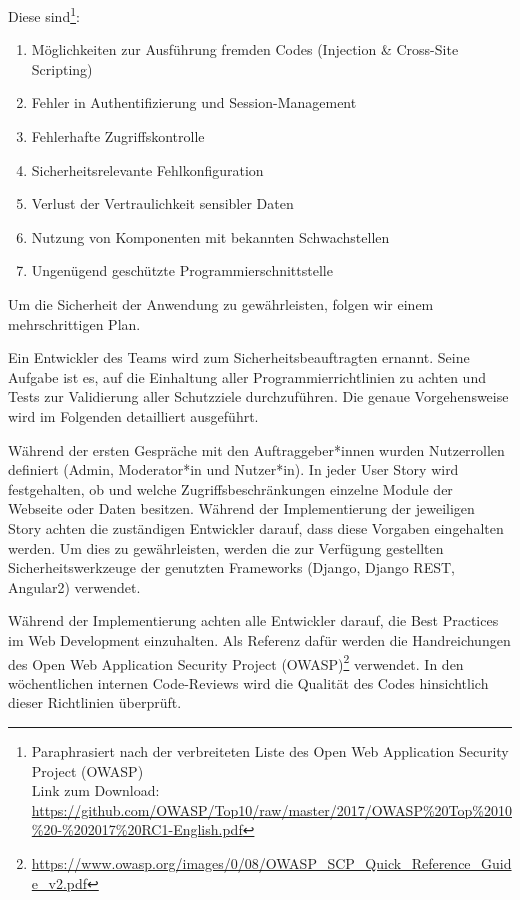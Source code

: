 \documentclass[accentcolor=tud0b,12pt,paper=a4]{tudreport}
\begin{document}
Diese sind\footnote{Paraphrasiert nach der verbreiteten Liste des Open Web Application Security Project (OWASP) \\
	Link zum Download:  \href{https://github.com/OWASP/Top10/raw/master/2017/OWASP\%20Top\%2010\%20-\%202017\%20RC1-English.pdf}{https://github.com/OWASP/Top10/raw/master/2017/OWASP\%20Top\%2010\%20-\%202017\%20RC1-English.pdf}}:
\begin{enumerate}
\item Möglichkeiten zur Ausführung fremden Codes (Injection \& Cross-Site Scripting)
\item Fehler in Authentifizierung und Session-Management
\item Fehlerhafte Zugriffskontrolle
\item Sicherheitsrelevante Fehlkonfiguration
\item Verlust der Vertraulichkeit sensibler Daten
\item Nutzung von Komponenten mit bekannten Schwachstellen
\item Ungenügend geschützte Programmierschnittstelle
\end{enumerate}

Um die Sicherheit der Anwendung zu gewährleisten, folgen wir einem mehrschrittigen Plan.

Ein Entwickler des Teams wird zum Sicherheitsbeauftragten ernannt. Seine Aufgabe ist es, auf die Einhaltung aller Programmierrichtlinien zu achten und Tests zur Validierung aller Schutzziele durchzuführen. Die genaue Vorgehensweise wird im Folgenden detailliert ausgeführt.

Während der ersten Gespräche mit den Auftraggeber*innen wurden Nutzerrollen definiert (Admin, Moderator*in und Nutzer*in). In jeder User Story wird festgehalten, ob und welche Zugriffsbeschränkungen einzelne Module der Webseite oder Daten besitzen. Während der Implementierung der jeweiligen Story achten die zuständigen Entwickler darauf, dass diese Vorgaben eingehalten werden. Um dies zu gewährleisten, werden die zur Verfügung gestellten Sicherheitswerkzeuge der genutzten Frameworks (Django, Django REST, Angular2) verwendet.

Während der Implementierung achten alle Entwickler darauf, die Best Practices im Web Development einzuhalten. Als Referenz dafür werden die Handreichungen des Open Web Application Security Project (OWASP)\footnote{\href{https://www.owasp.org/images/0/08/OWASP_SCP_Quick_Reference_Guide_v2.pdf}{https://www.owasp.org/images/0/08/OWASP\_SCP\_Quick\_Reference\_Guide\_v2.pdf}} verwendet. In den wöchentlichen internen Code-Reviews wird die Qualität des Codes hinsichtlich dieser Richtlinien überprüft.
\end{document}
